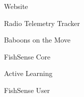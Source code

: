 \item Website
\item Radio Telemetry Tracker
\item Baboons on the Move
\item FishSense Core
\item Active Learning
\item FishSense User
